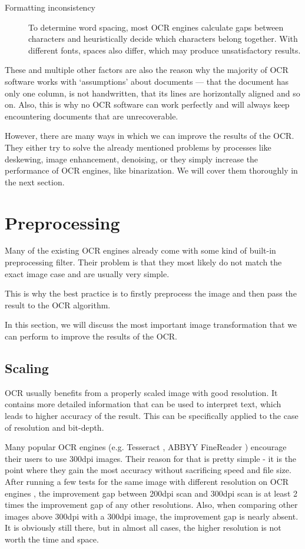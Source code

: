 \begin{description}
\item[Formatting inconsistency] To determine word spacing, most OCR engines calculate gaps between characters and heuristically decide which characters belong together. With different fonts, spaces also differ, which may produce unsatisfactory results.
\end{description}

These and multiple other factors are also the reason why the majority of OCR software works with `assumptions' about documents --- that the document has only one column, is not handwritten, that its lines are horizontally aligned and so on. Also, this is why no OCR software can work perfectly and will always keep encountering documents that are unrecoverable. 

However, there are many ways in which we can improve the results of the OCR. They either try to solve the already mentioned problems by processes like deskewing, image enhancement, denoising, or they simply increase the performance of OCR engines, like binarization. We will cover them thoroughly in the next section.

\section{Preprocessing}

Many of the existing OCR engines already come with some kind of built-in preprocessing filter. Their problem is that they most likely do not match the exact image case and are usually very simple.

This is why the best practice is to firstly preprocess the image and then pass the result to the OCR algorithm.

In this section, we will discuss the most important image transformation that we can perform to improve the results of the OCR. 

\subsection{Scaling}

OCR usually benefits from a properly scaled image with good resolution. It contains more detailed information that can be used to interpret text, which leads to higher accuracy of the result. This can be specifically applied to the case of resolution and bit-depth.

Many popular OCR engines (e.g. Tesseract \citep{TesseractQual}, ABBYY FineReader \citep{ABBYYdpi}) encourage their users to use 300dpi images. Their reason for that is pretty simple - it is the point where they gain the most accuracy without sacrificing speed and file size. After running a few tests for the same image with different resolution on OCR engines \citep{preprocessAll}, the improvement gap between 200dpi scan and 300dpi scan is at least 2 times the improvement gap of any other resolutions. Also, when comparing other images above 300dpi with a 300dpi image, the improvement gap is nearly absent. It is obviously still there, but in almost all cases, the higher resolution is not worth the time and space. 

